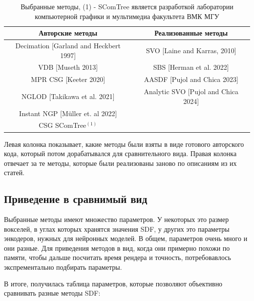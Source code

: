 \documentclass[a4paper,hidelinks,12pt]{article}
\begin{document}
\begin{table}[h!]
	\centering
	\begin{tabular}{|c|c|}
	\hline
	Авторские методы & Реализованные методы \\
	\hline
	Decimation [Garland and Heckbert 1997]   & SVO [Laine and Karras, 2010]  \\
	VDB [Museth 2013]   & SBS [Herman et al. 2022]  \\
	MPR CSG [Keeter 2020] & AASDF [Pujol and Chica 2023] \\
	NGLOD [Takikawa et al. 2021] & Analytic SVO [Pujol and Chica 2024]\\
	Instant NGP [Müller et. al 2022] & \\
	CSG SComTree$^{(1)}$ & \\
	\hline
	\end{tabular}
	\caption{Выбранные методы, (1) - SComTree является разработкой лаборатории компьютерной графики и мультимедиа факультета ВМК МГУ}
	\label{tab:twocol}
	\end{table}

	Левая колонка показывает, какие методы были взяты в виде готового авторского кода, который потом дорабатывался для сравнительного вида. Правая колонка 
	отвечает за те методы, которые были реализованы заново по описаниям из их статей.

\subsection{Приведение в сравнимый вид}

Выбранные методы имеют множество параметров. У некоторых это размер вокселей, в углах которых хранятся значения SDF, у других это параметры энкодеров, нужных для 
нейронных моделей. В общем, параметров очень много и они разные. Для приведения методов в вид, когда они примерно похожи по памяти, чтобы дальше посчитать 
время рендера и точность, потребовавлось экспрементально подбирать параметры. 

В итоге, получилась таблица параметров, которые позволяют объективно сравнивать разные методы SDF:
\end{document}
